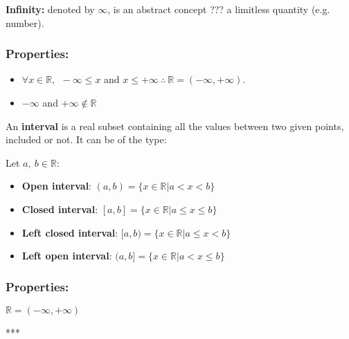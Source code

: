 \documentclass[12pt, a4paper]{book}
\begin{document}
\begin{defn}
  \textbf{Infinity:} denoted by $\infty$, is an abstract concept ??? a limitless quantity (e.g. number).
\end{defn}

\subsubsection*{Properties:}

\begin{itemize}
  \item $\forall x \in \mathbb{R}, \ \ - \infty \leq x$ and $x \leq + \infty \ \therefore \ \mathbb{R}=(-\infty, +\infty).$
  \item $-\infty$ and $+\infty \notin \mathbb{R}$
\end{itemize}

\begin{defn}
  An \textbf{interval} is a real subset containing all the values between two given points, included or not. It can be of the type: 
  
  Let $a, \ b \in \mathbb{R}$:
  \begin{itemize}
    \item \textbf{Open interval}: $(a,b) = \{x\in \mathbb{R} \vert a < x < b\}$
    \item \textbf{Closed interval}: $[a,b] = \{x\in \mathbb{R} \vert a \leq x \leq b\}$
    \item \textbf{Left closed interval}: $[a,b) = \{x\in \mathbb{R} \vert a \leq x<b\}$
    \item \textbf{Left open interval}: $(a,b] = \{x\in \mathbb{R} \vert a < x \leq b\}$
  \end{itemize}
\end{defn}

\subsubsection*{Properties:} $\mathbb{R} = (-\infty , +\infty)$

***
\end{document}

